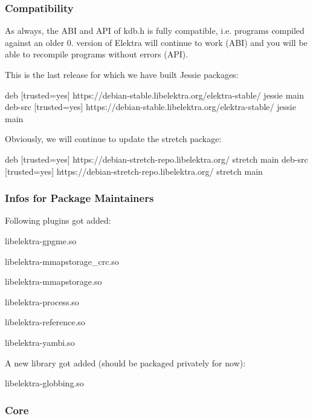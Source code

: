 \subsubsection*{Compatibility}

As always, the A\+BI and A\+PI of kdb.\+h is fully compatible, i.\+e. programs compiled against an older 0. version of Elektra will continue to work (A\+BI) and you will be able to recompile programs without errors (A\+PI).

This is the last release for which we have built Jessie packages\+: \begin{DoxyVerb}    deb     [trusted=yes] https://debian-stable.libelektra.org/elektra-stable/ jessie main
    deb-src [trusted=yes] https://debian-stable.libelektra.org/elektra-stable/ jessie main
\end{DoxyVerb}


Obviously, we will continue to update the stretch package\+: \begin{DoxyVerb}    deb     [trusted=yes] https://debian-stretch-repo.libelektra.org/ stretch main
    deb-src [trusted=yes] https://debian-stretch-repo.libelektra.org/ stretch main
\end{DoxyVerb}


\subsubsection*{Infos for Package Maintainers}

Following plugins got added\+:


\begin{DoxyItemize}
\item libelektra-\/gpgme.\+so
\item libelektra-\/mmapstorage\+\_\+crc.\+so
\item libelektra-\/mmapstorage.\+so
\item libelektra-\/process.\+so
\item libelektra-\/reference.\+so
\item libelektra-\/yambi.\+so
\end{DoxyItemize}

A new library got added (should be packaged privately for now)\+:


\begin{DoxyItemize}
\item libelektra-\/globbing.\+so
\end{DoxyItemize}

\subsubsection*{Core}

